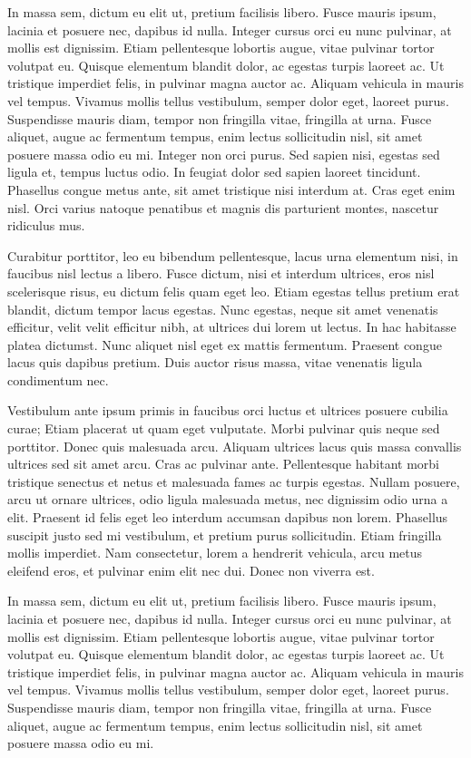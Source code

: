 \documentclass{news}
\begin{document}
\begin{multicols}{4}
In massa sem, dictum eu elit ut, pretium facilisis libero. Fusce mauris ipsum, lacinia et posuere nec, dapibus id nulla. Integer cursus orci eu nunc pulvinar, at mollis est dignissim. Etiam pellentesque lobortis augue, vitae pulvinar tortor volutpat eu. Quisque elementum blandit dolor, ac egestas turpis laoreet ac. Ut tristique imperdiet felis, in pulvinar magna auctor ac. Aliquam vehicula in mauris vel tempus. Vivamus mollis tellus vestibulum, semper dolor eget, laoreet purus. Suspendisse mauris diam, tempor non fringilla vitae, fringilla at urna. Fusce aliquet, augue ac fermentum tempus, enim lectus sollicitudin nisl, sit amet posuere massa odio eu mi. Integer non orci purus. Sed sapien nisi, egestas sed ligula et, tempus luctus odio. In feugiat dolor sed sapien laoreet tincidunt. Phasellus congue metus ante, sit amet tristique nisi interdum at. Cras eget enim nisl. Orci varius natoque penatibus et magnis dis parturient montes, nascetur ridiculus mus.

Curabitur porttitor, leo eu bibendum pellentesque, lacus urna elementum nisi, in faucibus nisl lectus a libero. Fusce dictum, nisi et interdum ultrices, eros nisl scelerisque risus, eu dictum felis quam eget leo. Etiam egestas tellus pretium erat blandit, dictum tempor lacus egestas. Nunc egestas, neque sit amet venenatis efficitur, velit velit efficitur nibh, at ultrices dui lorem ut lectus. In hac habitasse platea dictumst. Nunc aliquet nisl eget ex mattis fermentum. Praesent congue lacus quis dapibus pretium. Duis auctor risus massa, vitae venenatis ligula condimentum nec.

Vestibulum ante ipsum primis in faucibus orci luctus et ultrices posuere cubilia curae; Etiam placerat ut quam eget vulputate. Morbi pulvinar quis neque sed porttitor. Donec quis malesuada arcu. Aliquam ultrices lacus quis massa convallis ultrices sed sit amet arcu. Cras ac pulvinar ante. Pellentesque habitant morbi tristique senectus et netus et malesuada fames ac turpis egestas. Nullam posuere, arcu ut ornare ultrices, odio ligula malesuada metus, nec dignissim odio urna a elit. Praesent id felis eget leo interdum accumsan dapibus non lorem. Phasellus suscipit justo sed mi vestibulum, et pretium purus sollicitudin. Etiam fringilla mollis imperdiet. Nam consectetur, lorem a hendrerit vehicula, arcu metus eleifend eros, et pulvinar enim elit nec dui. Donec non viverra est.

In massa sem, dictum eu elit ut, pretium facilisis libero. Fusce mauris ipsum, lacinia et posuere nec, dapibus id nulla. Integer cursus orci eu nunc pulvinar, at mollis est dignissim. Etiam pellentesque lobortis augue, vitae pulvinar tortor volutpat eu. Quisque elementum blandit dolor, ac egestas turpis laoreet ac. Ut tristique imperdiet felis, in pulvinar magna auctor ac. Aliquam vehicula in mauris vel tempus. Vivamus mollis tellus vestibulum, semper dolor eget, laoreet purus. Suspendisse mauris diam, tempor non fringilla vitae, fringilla at urna. Fusce aliquet, augue ac fermentum tempus, enim lectus sollicitudin nisl, sit amet posuere massa odio eu mi.


\end{multicols}
\end{document}
